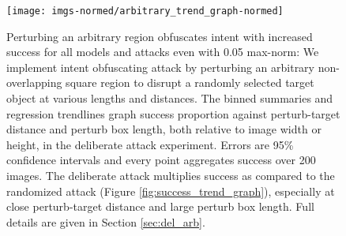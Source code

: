 \documentclass[
]{article}
\begin{document}
\begin{figure}[tb]

{\centering \texttt{[image: imgs-normed/arbitrary\_trend\_graph-normed]} 

}

\caption{Perturbing an arbitrary region obfuscates intent with increased success for all models and attacks even with 0.05 max-norm:  We implement intent obfuscating attack by perturbing an arbitrary non-overlapping square region to disrupt a randomly selected target object at various lengths and distances. The binned summaries and regression trendlines graph success proportion against perturb-target distance and perturb box length, both relative to image width or height, in the deliberate attack experiment. Errors are 95\% confidence intervals and every point aggregates success over 200 images. The deliberate attack multiplies success as compared to the randomized attack (Figure \ref{fig:success_trend_graph}), especially at close perturb-target distance and large perturb box length. Full details are given in Section \ref{sec:del_arb}.}\label{fig:arbitrary_trend_graph_normed}
\end{figure}

\begingroup\fontsize{9}{11}\selectfont
\end{document}
